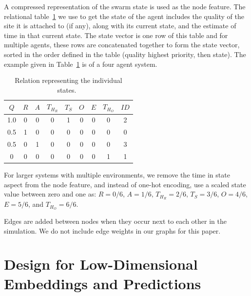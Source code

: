 \documentclass[openacc]{rsproca_new}%
\begin{document}
A compressed representation of the swarm state is used as the node feature. The relational table~\ref{tab:relation} we use to get the state of the agent includes the quality of the site it is attached to (if any), along with its current state, and the estimate of time in that current state. The state vector is one row of this table and for multiple agents, these rows are concatenated together to form the state vector, sorted in the order defined in the table (quality highest priority, then state). The example given in Table~\ref{tab:relation} is of a four agent system.
\begin{table}[!h]
    \caption{Relation representing the individual states.~\cite{cdcpaper}}
    \label{tab:relation}
\begin{tabular}{|c|c|c|c|c|c|c|c|c|}\hline
        $Q$ & $R$ & $A$ & $T_{H_R}$ & $T_S$ & $O$ & 
 $E$ & $T_{H_O}$ &  $ID$ \\
 \hline\hline
1.0	& 0	& 0	& 0 & 1 & 0 & 0 & 0  & 2\\
0.5 & 1 & 0 & 0 & 0 & 0 & 0 & 0  & 0\\
0.5 & 0 & 1 & 0 & 0 & 0 & 0 & 0  & 3\\
0 & 0 & 0 & 0 & 0 & 0 & 0 & 1  & 1 \\
\hline
    \end{tabular}
\vspace*{-4pt}
\end{table}

For larger systems with multiple environments, we remove the time in state aspect from the node feature, and instead of one-hot encoding, use a scaled state value between zero and one as: $R=0/6$, $A=1/6$, $T_{H_R}=2/6$, $T_S = 3/6$, $O=4/6$, $E=5/6$, and $T_{H_O}=6/6$. 

Edges are added between nodes when they occur next to each other in the simulation. We do not include edge weights in our graphs for this paper.





\section{Design for Low-Dimensional Embeddings and Predictions}
\end{document}
